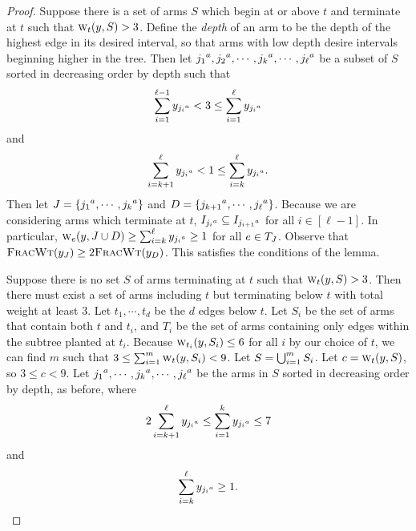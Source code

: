 \begin{proof}
    Suppose there is a set of arms $S$ which begin at or above $t$ and
    terminate at $t$ such that $\fwe(y, S) > 3$. Define the {\em depth} of an arm
    to be the depth of the highest edge in its desired interval, so that arms
    with low depth desire intervals beginning higher in the tree. Then let
    $\armj[j_1], \armj[j_2], \cdots, \armj[j_k], \cdots, \armj[j_\ell]$ be a
    subset of $S$ sorted in decreasing order by depth such that
    \[
        \sum_{i=1}^{\ell-1}y_{\armj[j_i]} < 3 \le \sum_{i=1}^\ell y_{\armj[j_i]}
    \]
    and
    \[
        \sum_{i=k+1}^{\ell} y_{\armj[j_i]} < 1 \le \sum_{i=k}^\ell y_{\armj[j_i]}.
    \]
    Then let $\tlayer = \{\armj[j_1], \cdots, \armj[j_k]\}$ and $D =
    \{\armj[j_{k+1}], \cdots, \armj[j_\ell]\}$.  Because we are considering
    arms which terminate at $t$, $\intj[{\armj[j_i]}] \subseteq
    \intj[{\armj[j_{i+1}]}]$ for all $i \in [\ell-1]$. In particular,
    $\fwe[e](y, \tlayer
    \union D)\geq \sum_{i=k}^{\ell}y_{\armj[j_i]}\ge 1$ for all $e \in T_\tlayer$.
    Observe that $\fwt(y_\tlayer) \ge 2 \fwt(y_D)$. %
    This satisfies the conditions of the lemma.

    Suppose there is no set $S$ of arms terminating at $t$ such that
    $\fwe(y, S)
    > 3$. Then there must exist a set of arms including $t$ but terminating
    below $t$ with total weight at least $3$. Let $t_1, \cdots, t_d$ be the $d$
    edges below $t$.  Let $S_i$ be the set of arms that contain both $t$ and
    $t_i$, and $T_i$ be the set of arms containing only edges within the
    subtree planted at $t_i$. Because $\fwe[t_i](y, S_i) \le 6$ for all $i$ by our
    choice of $t$, we can find $m$ such that $3 \le \sum_{i=1}^m
    \fwe(y, S_i) <
    9$. Let $S = \Union_{i=1}^m S_i$. Let $c = \fwe(y, S)$, so $3 \le c < 9$.
    Let $\armj[j_1], \cdots, \armj[j_k], \cdots, \armj[j_\ell]$ be the arms in
    $S$ sorted in decreasing order by depth, as before, where 
    \[
        2\sum_{i=k+1}^{\ell} y_{\armj[j_i]} \le \sum_{i=1}^k y_{\armj[j_i]}\leq 7
    \]
    and
    \[
        \sum_{i=k}^{\ell} y_{\armj[j_i]} \geq 1.
    \]


\end{proof}
